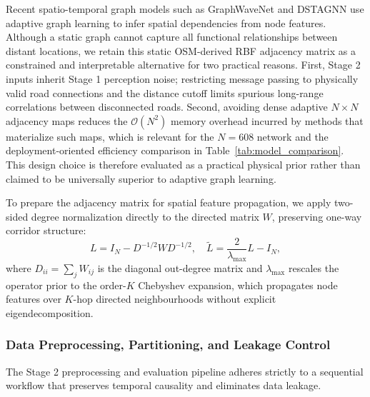 \documentclass[preprint,12pt]{elsarticle}
\begin{document}
Recent spatio-temporal graph models such as GraphWaveNet \citep{wavenet} and DSTAGNN \citep{dstagnn} use adaptive graph learning to infer spatial dependencies from node features. Although a static graph cannot capture all functional relationships between distant locations, we retain this static OSM-derived RBF adjacency matrix as a constrained and interpretable alternative for two practical reasons. First, Stage 2 inputs inherit Stage 1 perception noise; restricting message passing to physically valid road connections and the distance cutoff limits spurious long-range correlations between disconnected roads. Second, avoiding dense adaptive $N \times N$ adjacency maps reduces the $\mathcal{O}(N^2)$ memory overhead incurred by methods that materialize such maps, which is relevant for the $N=608$ network and the deployment-oriented efficiency comparison in Table~\ref{tab:model_comparison}. This design choice is therefore evaluated as a practical physical prior rather than claimed to be universally superior to adaptive graph learning.

To prepare the adjacency matrix for spatial feature propagation, we apply two-sided degree normalization directly to the directed matrix $W$, preserving one-way corridor structure:
\begin{equation}
L = I_N - D^{-1/2} W D^{-1/2}, \quad \tilde{L} = \frac{2}{\lambda_{\max}} L - I_N,
\end{equation}
where $D_{ii} = \sum_{j} W_{ij}$ is the diagonal out-degree matrix and $\lambda_{\max}$ rescales the operator prior to the order-$K$ Chebyshev expansion, which propagates node features over $K$-hop directed neighbourhoods without explicit eigendecomposition.


\subsubsection{Data Preprocessing, Partitioning, and Leakage Control}
\label{sec:data_partitioning}

The Stage 2 preprocessing and evaluation pipeline adheres strictly to a sequential workflow that preserves temporal causality and eliminates data leakage.
\end{document}
